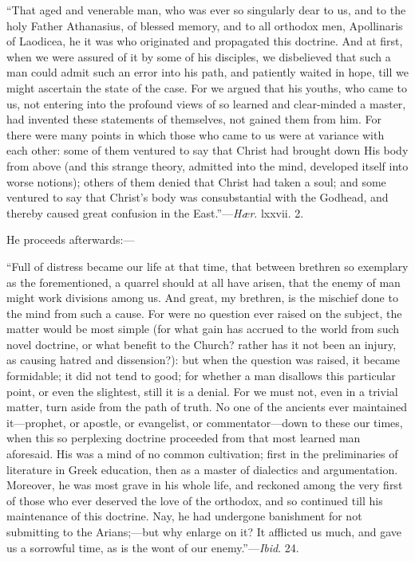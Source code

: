 ``That aged and venerable man, who was ever so singularly dear
to us, and to the holy Father Athanasius, of blessed memory, and to
all orthodox men, Apollinaris of Laodicea, he it was who originated
and propagated this doctrine. And at first, when we were assured of it
by some of his disciples, we disbelieved that such a man could admit
such an error into his path, and patiently waited in hope, till we
might ascertain the state of the case. For we argued that his youths, who came to us, not entering into the profound views of so
learned and clear-minded a master, had invented these statements of
themselves, not gained them from him. For there were many points in
which those who came to us were at variance with each other: some of
them ventured to say that Christ had brought down His body from above
(and this strange theory, admitted into the mind, developed itself
into worse notions); others of them denied that Christ had taken a
soul; and some ventured to say that Christ's body was consubstantial
with the Godhead, and thereby caused great confusion in the
East.''—\emph{Hær}. lxxvii. 2.

He proceeds afterwards:—

``Full of distress became our life at that time, that between
brethren so exemplary as the forementioned, a quarrel should at all
have arisen, that the enemy of man might work divisions among us. And
great, my brethren, is the mischief done to the mind from such a
cause. For were no question ever raised on the subject, the matter
would be most simple (for what gain has accrued to the world from such
novel doctrine, or what benefit to the Church? rather has it not been
an injury, as causing hatred and dissension?): but when the question
was raised, it became formidable; it did not tend to good; for whether
a man disallows this particular point, or even the slightest, still it
is a denial. For we must not, even in a trivial matter, turn aside
from the path of truth. No one of the ancients ever maintained it—prophet,
or apostle, or evangelist, or commentator—down to these our times,
when this so perplexing doctrine proceeded from that most learned man
aforesaid. His was a mind of no common cultivation; first in the
preliminaries of literature in Greek education, then as a master of
dialectics and argumentation. Moreover, he was most grave in his whole
life, and reckoned among the very first of those who ever deserved the
love of the orthodox, and so continued till his maintenance of this
doctrine. Nay, he had undergone banishment for not submitting to the
Arians;—but why enlarge on it? It afflicted us much, and gave us a
sorrowful time, as is the wont of our enemy.''—\emph{Ibid}. 24.

